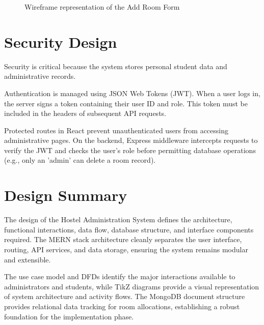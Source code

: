 \begin{figure}[H]
    \centering
    \caption{Wireframe representation of the Add Room Form}
    \label{fig:addroom}
\end{figure}

\section{Security Design}

Security is critical because the system stores personal student data and administrative records. 

Authentication is managed using JSON Web Tokens (JWT). When a user logs in, the server signs a token containing their user ID and role. This token must be included in the headers of subsequent API requests.

Protected routes in React prevent unauthenticated users from accessing administrative pages. On the backend, Express middleware intercepts requests to verify the JWT and checks the user's role before permitting database operations (e.g., only an 'admin' can delete a room record).

\section{Design Summary}

The design of the Hostel Administration System defines the architecture, functional interactions, data flow, database structure, and interface components required. The MERN stack architecture cleanly separates the user interface, routing, API services, and data storage, ensuring the system remains modular and extensible.

The use case model and DFDs identify the major interactions available to administrators and students, while TikZ diagrams provide a visual representation of system architecture and activity flows. The MongoDB document structure provides relational data tracking for room allocations, establishing a robust foundation for the implementation phase.
